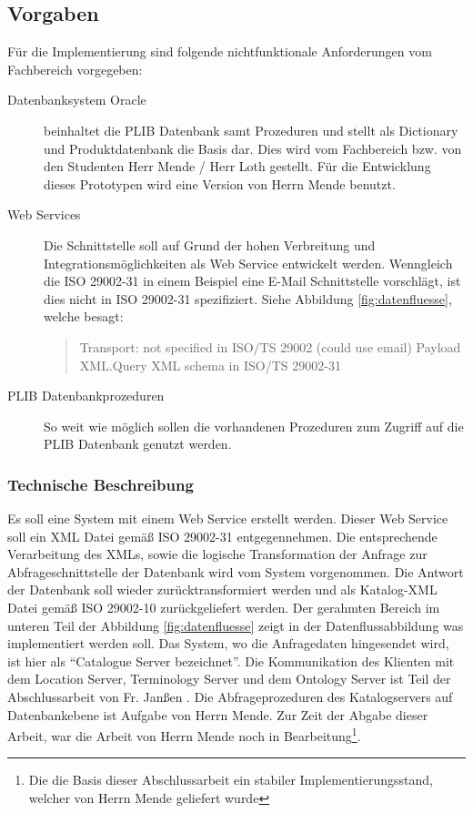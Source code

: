 \subsection{Vorgaben}

Für die Implementierung sind folgende nichtfunktionale Anforderungen vom Fachbereich vorgegeben:
\begin{description}
\item[Datenbanksystem Oracle] beinhaltet die PLIB Datenbank samt Prozeduren und stellt als Dictionary und Produktdatenbank die Basis dar. Dies wird vom Fachbereich bzw. von den Studenten Herr Mende / Herr Loth gestellt. Für die Entwicklung dieses Prototypen wird eine Version von Herrn Mende benutzt. 
\item[Web Services] Die Schnittstelle soll auf Grund der hohen Verbreitung und Integrationsmöglichkeiten als Web Service entwickelt werden. Wenngleich die ISO 29002-31 in einem Beispiel eine E-Mail Schnittstelle vorschlägt, ist dies nicht in ISO 29002-31 spezifiziert. Siehe Abbildung \ref{fig:datenfluesse}, welche besagt:
\begin{quotation}
Transport: not specified in ISO/TS 29002 (could use email) Payload XML.Query XML schema in ISO/TS 29002-31
\end{quotation}
\item[PLIB Datenbankprozeduren] So weit wie möglich sollen die vorhandenen Prozeduren zum Zugriff auf die PLIB Datenbank genutzt werden. 
\end{description}

\subsubsection{Technische Beschreibung}
Es soll eine System mit einem Web Service erstellt werden. Dieser Web Service soll ein XML Datei gemäß ISO 29002-31 entgegennehmen. Die entsprechende Verarbeitung des XMLs, sowie die logische Transformation der Anfrage zur Abfrageschnittstelle der Datenbank wird vom System vorgenommen. Die Antwort der Datenbank soll wieder zurücktransformiert werden und als Katalog-XML Datei gemäß ISO 29002-10 zurückgeliefert werden. 
Der gerahmten Bereich im unteren Teil der Abbildung \ref{fig:datenfluesse} zeigt in der Datenflussabbildung was implementiert werden soll. Das System, wo die Anfragedaten hingesendet wird, ist hier als \enquote{Catalogue Server bezeichnet}. 
Die Kommunikation des Klienten mit dem Location Server, Terminology Server und dem Ontology Server ist Teil der Abschlussarbeit von Fr. Janßen \citep[Vergl.][]{janssen}. 
Die Abfrageprozeduren des Katalogservers auf Datenbankebene ist Aufgabe von Herrn Mende. Zur Zeit der Abgabe dieser Arbeit, war die Arbeit von Herrn Mende noch in Bearbeitung\footnote{Die die Basis dieser Abschlussarbeit ein stabiler Implementierungsstand, welcher von Herrn Mende geliefert wurde}. 

